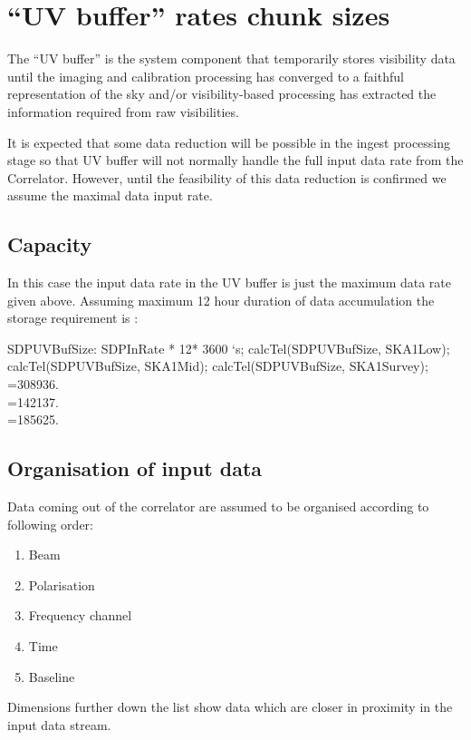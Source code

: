 \documentclass[useAMS,usenatbib,referee]{article}
\begin{document}
\section{``UV buffer'' rates chunk sizes}

The ``UV buffer'' is the system component that temporarily stores
visibility data until the imaging and calibration processing has
converged to a faithful representation of the sky and/or
visibility-based processing has extracted the information required
from raw visibilities. 

It is expected that some data reduction will be possible in the ingest
processing stage so that UV buffer will not normally handle the full
input data rate from the Correlator. However, until the feasibility of
this data reduction is confirmed we assume the maximal data input
rate. 

\subsection{Capacity}

In this case the input data rate in the UV buffer is just the maximum
data rate given above. Assuming maximum 12 hour duration of data
accumulation the storage requirement is :
\begin{maxima}[]
SDPUVBufSize: SDPInRate * 12* 3600 `s;
calcTel(SDPUVBufSize, SKA1Low);
calcTel(SDPUVBufSize, SKA1Mid);
calcTel(SDPUVBufSize, SKA1Survey);
\maximaoutput*
{}\;\, \\
\m  {}=308936.\; \\
\m  {}=142137.\; \\
\m  {}=185625.\; \\
\end{maxima}

\subsection{Organisation of input data}

Data coming out of the correlator are assumed to be organised
according to following order:
\begin{enumerate}
  \item Beam
  \item Polarisation
  \item Frequency channel
  \item Time 
  \item Baseline
\end{enumerate}
Dimensions further down the list show data which are closer in
proximity in the input data stream. 
\end{document}
